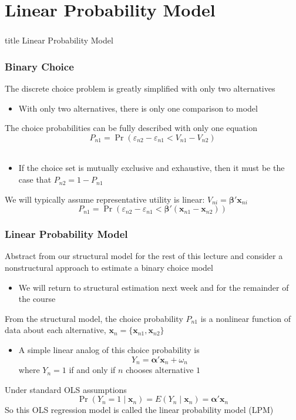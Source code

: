 \documentclass{beamer}\usepackage[]{graphicx}\usepackage[]{color}
\begin{document}
\section{Linear Probability Model}
\label{lpm}
\begin{frame}\frametitle{}
    \vfill
    \centering
    \begin{beamercolorbox}[center]{title}
        \Large Linear Probability Model
    \end{beamercolorbox}
    \vfill
\end{frame}

\begin{frame}\frametitle{Binary Choice}
    The discrete choice problem is greatly simplified with only two alternatives
    \begin{itemize}
    	\item With only two alternatives, there is only one comparison to model
    \end{itemize}
    \vspace{3ex}
    The choice probabilities can be fully described with only one equation 
    $$P_{n1} = \Pr(\varepsilon_{n2} - \varepsilon_{n1} < V_{n1} - V_{n2})$$ \\
    \begin{itemize}
    	\item If the choice set is mutually exclusive and exhaustive, then it must be the case that $P_{n2} = 1 - P_{n1}$
    \end{itemize}
    \vspace{3ex}
    We will typically assume representative utility is linear: $V_{ni} = \bm{\beta}' \bm{x}_{ni}$
    $$P_{n1} = \Pr(\varepsilon_{n2} - \varepsilon_{n1} < \bm{\beta}' (\bm{x}_{n1} - \bm{x}_{n2}))$$
\end{frame}

\begin{frame}\frametitle{Linear Probability Model}
    Abstract from our structural model for the rest of this lecture and consider a nonstructural approach to estimate a binary choice model
    \begin{itemize}
    	\item We will return to structural estimation next week and for the remainder of the course
    \end{itemize}
    \vspace{2ex}
	From the structural model, the choice probability $P_{n1}$ is a nonlinear function of data about each alternative, $\bm{x}_n = \{\bm{x}_{n1}, \bm{x}_{n2}\}$
	\begin{itemize}
	  \item A simple linear analog of this choice probability is
    $$Y_n = \bm{\alpha}' \bm{x}_n + \omega_n$$
    where $Y_n = 1$ if and only if $n$ chooses alternative $1$
	\end{itemize}
    \vspace{2ex}
    Under standard OLS assumptions
    $$\Pr(Y_n = 1 \mid \bm{x}_n) = E(Y_n \mid \bm{x}_n) = \bm{\alpha}' \bm{x}_n$$
    So this OLS regression model is called the linear probability model (LPM)
\end{frame}
\end{document}
